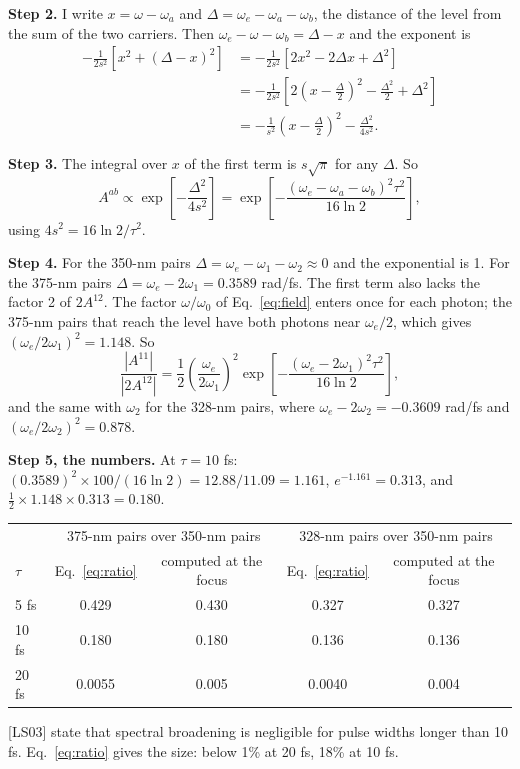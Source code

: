 \documentclass[11pt]{article}
\begin{document}
\textbf{Step 2.} I write $x = \omega - \omega_a$ and $\Delta = \omega_e - \omega_a - \omega_b$, the distance of
the level from the sum of the two carriers. Then $\omega_e - \omega - \omega_b = \Delta - x$ and the exponent is
\begin{align}-\frac{1}{2s^2}\left[x^2 + (\Delta - x)^2\right]
&= -\frac{1}{2s^2}\left[2x^2 - 2\Delta x + \Delta^2\right]\\
&= -\frac{1}{2s^2}\left[2\left(x - \frac{\Delta}{2}\right)^2 - \frac{\Delta^2}{2} + \Delta^2\right]\\
&= -\frac{1}{s^2}\left(x - \frac{\Delta}{2}\right)^2 - \frac{\Delta^2}{4s^2} .\end{align}

\textbf{Step 3.} The integral over $x$ of the first term is $s\sqrt{\pi}$ for any $\Delta$. So
\begin{equation}A^{ab} \propto \exp\!\left[-\frac{\Delta^2}{4s^2}\right]
= \exp\!\left[-\frac{(\omega_e-\omega_a-\omega_b)^2\tau^2}{16\ln 2}\right],\end{equation}
using $4s^2 = 16\ln 2/\tau^2$.

\textbf{Step 4.} For the 350-nm pairs $\Delta = \omega_e - \omega_1 - \omega_2 \approx 0$ and the exponential is 1.
For the 375-nm pairs $\Delta = \omega_e - 2\omega_1 = 0.3589$ rad/fs. The first term also lacks the factor 2 of
$2A^{12}$. The factor $\omega/\omega_0$ of Eq.~\ref{eq:field} enters once for each photon; the 375-nm pairs that reach the level
have both photons near $\omega_e/2$, which gives $(\omega_e/2\omega_1)^2 = 1.148$. So
\begin{equation}\frac{|A^{11}|}{|2A^{12}|} = \frac12\left(\frac{\omega_e}{2\omega_1}\right)^2
\exp\!\left[-\frac{(\omega_e-2\omega_1)^2\tau^2}{16\ln 2}\right] ,\label{eq:ratio}\end{equation}
and the same with $\omega_2$ for the 328-nm pairs, where $\omega_e - 2\omega_2 = -0.3609$ rad/fs and
$(\omega_e/2\omega_2)^2 = 0.878$.

\textbf{Step 5, the numbers.} At $\tau = 10$ fs: $(0.3589)^2\times100/(16\ln 2) = 12.88/11.09 = 1.161$,
$e^{-1.161} = 0.313$, and $\tfrac12\times1.148\times0.313 = 0.180$.
\begin{center}\small\begin{tabular}{lcccc}\toprule
 & \multicolumn{2}{c}{375-nm pairs over 350-nm pairs} & \multicolumn{2}{c}{328-nm pairs over 350-nm pairs}\\
$\tau$ & Eq.~\ref{eq:ratio} & computed at the focus & Eq.~\ref{eq:ratio} & computed at the focus\\\midrule
5 fs & 0.429 & 0.430 & 0.327 & 0.327\\
10 fs & 0.180 & 0.180 & 0.136 & 0.136\\
20 fs & 0.0055 & 0.005 & 0.0040 & 0.004\\\bottomrule\end{tabular}\end{center}
[LS03] state that spectral broadening is negligible for pulse widths longer than 10 fs. Eq.~\ref{eq:ratio} gives the size:
below 1\% at 20 fs, 18\% at 10 fs.
\end{document}
